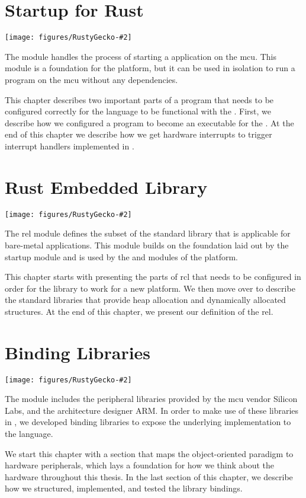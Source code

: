 
\newcommand{\corechapter}[3]{
  \chapter{#1}
  \label{chap:#2}
  \begin{center}
    \texttt{[image: figures/RustyGecko-\#2]}
  \end{center}
  \hfill \break
  \hfill \break
#3
}

\corechapter{Startup for Rust}{startup}{%
The  module handles the process of starting a {\rust} application on the \glsdesc{mcu}.
This module is a foundation for the {\rg} platform, but it can be used in isolation to run a program on the \gls{mcu} without any dependencies.

This chapter describes two important parts of a {\rust} program that needs to be configured correctly for the language to be functional with the {\gecko}.
First, we describe how we configured a {\rust} program to become an executable for the {\gecko}.
At the end of this chapter we describe how we get hardware interrupts to trigger interrupt handlers implemented in {\rust}.
}


\corechapter{Rust Embedded Library}{rel}{%
The \glsdesc{rel} module defines the subset of the standard {\rust} library that is applicable for bare-metal applications.
This module builds on the foundation laid out by the startup module and is used by the \lib{bindings} and \lib{Application Layer} modules of the {\rg} platform.

This chapter starts with presenting the parts of \gls{rcl} that needs to be configured in order for the library to work for a new platform.
We then move over to describe the standard {\rust} libraries that provide heap allocation and dynamically allocated structures.
At the end of this chapter, we present our definition of the \gls{rel}.
}



\corechapter{Binding Libraries}{bindings}{%
The  module includes the peripheral libraries provided by the \gls{mcu} vendor Silicon Labs, and the architecture designer ARM.
In order to make use of these libraries in {\rust}, we developed binding libraries to expose the underlying {\C} implementation to the {\rust} language.

We start this chapter with a section that maps the object-oriented paradigm to hardware peripherals, which lays a foundation for how we think about the hardware throughout this thesis.
In the last section of this chapter, we describe how we structured, implemented, and tested the library bindings.
}




